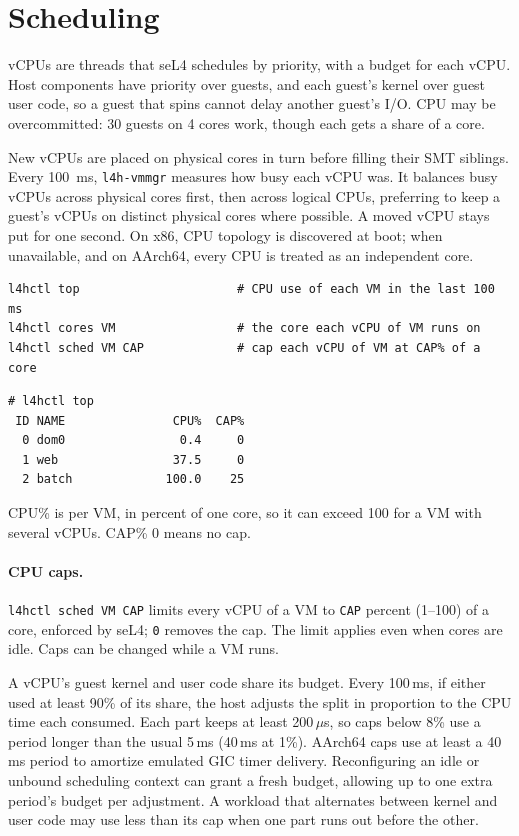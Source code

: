 \documentclass[11pt,a4paper]{report}
\newcommand{\cmd}[1]{\texttt{#1}}
\begin{document}
\section{Scheduling}

vCPUs are threads that seL4 schedules by priority, with a budget for each
vCPU. Host components have priority over guests, and each guest's kernel
over guest user code, so a guest that spins cannot delay another guest's
I/O. CPU may be overcommitted: 30 guests on 4 cores work, though each gets
a share of a core.

New vCPUs are placed on physical cores in turn before filling their SMT
siblings. Every 100~ms, \texttt{l4h-vmmgr} measures how busy each vCPU was.
It balances busy vCPUs across physical cores first, then across logical
CPUs, preferring to keep a guest's vCPUs on distinct physical cores where
possible. A moved vCPU stays put for one second. On x86, CPU topology is
discovered at boot; when unavailable, and on AArch64, every CPU is treated
as an independent core.

\begin{lstlisting}
l4hctl top                      # CPU use of each VM in the last 100 ms
l4hctl cores VM                 # the core each vCPU of VM runs on
l4hctl sched VM CAP             # cap each vCPU of VM at CAP% of a core
\end{lstlisting}

\begin{lstlisting}
# l4hctl top
 ID NAME               CPU%  CAP%
  0 dom0                0.4     0
  1 web                37.5     0
  2 batch             100.0    25
\end{lstlisting}
CPU\% is per VM, in percent of one core, so it can exceed 100 for a VM with
several vCPUs. CAP\% 0 means no cap.

\paragraph{CPU caps.} \cmd{l4hctl sched VM CAP} limits every vCPU of a VM to
\texttt{CAP} percent (1--100) of a core, enforced by seL4; \texttt{0} removes
the cap. The limit applies even when cores are idle. Caps can be changed
while a VM runs.

A vCPU's guest kernel and user code share its budget. Every 100\,ms, if
either used at least 90\% of its share, the host adjusts the split in
proportion to the CPU time each consumed. Each part keeps at least
200\,$\mu$s, so caps below 8\% use a period longer than the usual 5\,ms
(40\,ms at 1\%). AArch64 caps use at least a 40\,ms period to
amortize emulated GIC timer delivery. Reconfiguring an idle or unbound scheduling context can
grant a fresh budget, allowing up to one extra period's budget per
adjustment. A workload that alternates between kernel and user code may
use less than its cap when one part runs out before the other.
\end{document}
